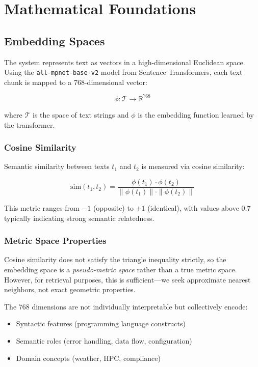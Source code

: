 \documentclass[11pt,letterpaper]{article}
\begin{document}
\section{Mathematical Foundations}

\subsection{Embedding Spaces}

The system represents text as vectors in a high-dimensional Euclidean space. Using the \texttt{all-mpnet-base-v2} model from Sentence Transformers, each text chunk is mapped to a 768-dimensional vector:

\begin{equation}
    \phi: \mathcal{T} \rightarrow \mathbb{R}^{768}
\end{equation}

where $\mathcal{T}$ is the space of text strings and $\phi$ is the embedding function learned by the transformer.

\subsubsection{Cosine Similarity}

Semantic similarity between texts $t_1$ and $t_2$ is measured via cosine similarity:

\begin{equation}
    \text{sim}(t_1, t_2) = \frac{\phi(t_1) \cdot \phi(t_2)}{\|\phi(t_1)\| \cdot \|\phi(t_2)\|}
\end{equation}

This metric ranges from $-1$ (opposite) to $+1$ (identical), with values above 0.7 typically indicating strong semantic relatedness.

\subsubsection{Metric Space Properties}

Cosine similarity does not satisfy the triangle inequality strictly, so the embedding space is a \textit{pseudo-metric space} rather than a true metric space. However, for retrieval purposes, this is sufficient---we seek approximate nearest neighbors, not exact geometric properties.

The 768 dimensions are not individually interpretable but collectively encode:
\begin{itemize}
    \item Syntactic features (programming language constructs)
    \item Semantic roles (error handling, data flow, configuration)
    \item Domain concepts (weather, HPC, compliance)
\end{itemize}
\end{document}
